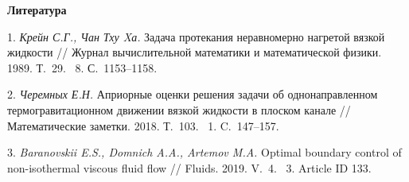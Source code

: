 \smallskip \centerline {\bf Литература} \nopagebreak

1. {\it Крейн С.Г., Чан Тху Xа.} Задача протекания неравномерно нагретой вязкой жидкости // Журнал вычислительной математики и математической физики. 1989. Т.~29. \No~8. С.~1153--1158.

2. {\it Черемных Е.Н.} Априорные оценки решения задачи об однонаправленном термогравитационном движении вязкой жидкости в плоском канале // Математические заметки. 2018. Т.~103. \No~1. C.~147--157.

3. {\it Baranovskii E.S., Domnich A.A., Artemov M.A.} Optimal boundary control of non-isothermal viscous fluid flow // Fluids. 2019. V.~4. \No~3. Article ID 133.

